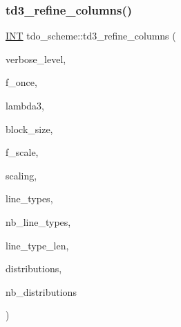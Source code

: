 \subsubsection{\texorpdfstring{td3\+\_\+refine\+\_\+columns()}{td3\_refine\_columns()}}
{\footnotesize\ttfamily \mbox{\hyperlink{galois_8h_a09fddde158a3a20bd2dcadb609de11dc}{I\+NT}} tdo\+\_\+scheme\+::td3\+\_\+refine\+\_\+columns (\begin{DoxyParamCaption}\item[{\mbox{\hyperlink{galois_8h_a09fddde158a3a20bd2dcadb609de11dc}{I\+NT}}}]{verbose\+\_\+level,  }\item[{\mbox{\hyperlink{galois_8h_a09fddde158a3a20bd2dcadb609de11dc}{I\+NT}}}]{f\+\_\+once,  }\item[{\mbox{\hyperlink{galois_8h_a09fddde158a3a20bd2dcadb609de11dc}{I\+NT}}}]{lambda3,  }\item[{\mbox{\hyperlink{galois_8h_a09fddde158a3a20bd2dcadb609de11dc}{I\+NT}}}]{block\+\_\+size,  }\item[{\mbox{\hyperlink{galois_8h_a09fddde158a3a20bd2dcadb609de11dc}{I\+NT}}}]{f\+\_\+scale,  }\item[{\mbox{\hyperlink{galois_8h_a09fddde158a3a20bd2dcadb609de11dc}{I\+NT}}}]{scaling,  }\item[{\mbox{\hyperlink{galois_8h_a09fddde158a3a20bd2dcadb609de11dc}{I\+NT}} $\ast$\&}]{line\+\_\+types,  }\item[{\mbox{\hyperlink{galois_8h_a09fddde158a3a20bd2dcadb609de11dc}{I\+NT}} \&}]{nb\+\_\+line\+\_\+types,  }\item[{\mbox{\hyperlink{galois_8h_a09fddde158a3a20bd2dcadb609de11dc}{I\+NT}} \&}]{line\+\_\+type\+\_\+len,  }\item[{\mbox{\hyperlink{galois_8h_a09fddde158a3a20bd2dcadb609de11dc}{I\+NT}} $\ast$\&}]{distributions,  }\item[{\mbox{\hyperlink{galois_8h_a09fddde158a3a20bd2dcadb609de11dc}{I\+NT}} \&}]{nb\+\_\+distributions }\end{DoxyParamCaption})}

\mbox{\label{classtdo__scheme_a408d97466d7eb8ab85a8b4f89d450481}} 
